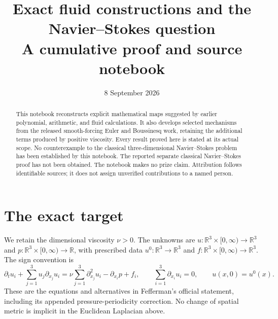 \documentclass[11pt,a4paper]{article}
\title{Exact fluid constructions and the Navier--Stokes question\\\large A cumulative proof and source notebook}
\author{}
\date{8 September 2026}
\theoremstyle{definition}
\theoremstyle{remark}
\newcommand{\R}{\mathbb R}
\begin{document}
\maketitle
\begin{abstract}
This notebook reconstructs explicit mathematical maps suggested by earlier
polynomial, arithmetic, and fluid calculations. It also develops selected
mechanisms from the released smooth-forcing Euler and Boussinesq work, retaining
the additional terms produced by positive viscosity. Every result proved here
is stated at its actual scope. No counterexample to the classical
three-dimensional Navier--Stokes problem has been established by this notebook.
The reported separate classical Navier--Stokes proof has not been obtained.
The notebook makes no prize claim. Attribution follows identifiable sources;
it does not assign unverified contributions to a named person.
\end{abstract}
\tableofcontents

\section{The exact target}
\label{sec:target}
We retain the dimensional viscosity $\nu>0$. The unknowns are
$u:\R^3\times[0,\infty)\to\R^3$ and
$p:\R^3\times[0,\infty)\to\R$, with prescribed data
$u^0:\R^3\to\R^3$ and $f:\R^3\times[0,\infty)\to\R^3$.
The sign convention is
\begin{equation}\label{eq:ns}
\partial_tu_i+\sum_{j=1}^3u_j\partial_{x_j}u_i
=\nu\sum_{j=1}^3\partial_{x_j}^2u_i-\partial_{x_i}p+f_i,
\qquad \sum_{i=1}^3\partial_{x_i}u_i=0,
\qquad u(x,0)=u^0(x).
\end{equation}
These are the equations and alternatives in Fefferman's official statement,
including its appended pressure-periodicity correction\cite{Fefferman}.
No change of spatial metric is implicit in the Euclidean Laplacian above.
\end{document}
